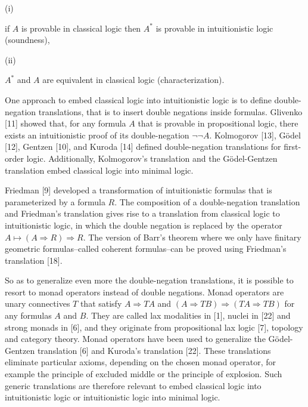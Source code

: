 \par\noindent  (i) 
 
if $A$ is provable in classical logic then $A^{*}$ is provable in intuitionistic logic (soundness),\par
 
 
 
\par\noindent  (ii) 
 
$A^{*}$ and $A$ are equivalent in classical logic (characterization).\par
 
 
  
One approach to embed classical logic into intuitionistic logic is to define double-negation translations, that is to insert double negations inside formulas. Glivenko [11] showed that, for any formula $A$ that is provable in propositional logic, there exists an intuitionistic proof of its double-negation $\neg\neg A$. Kolmogorov [13], Gödel [12], Gentzen [10], and Kuroda [14] defined double-negation translations for first-order logic. Additionally, Kolmogorov’s translation and the Gödel-Gentzen translation embed classical logic into minimal logic.\par
 
 
 
Friedman [9] developed a transformation of intuitionistic formulas that is parameterized by a formula $R$. The composition of a double-negation translation and Friedman’s translation gives rise to a translation from classical logic to intuitionistic logic, in which the double negation is replaced by the operator $A\mapsto(A\mathbin{\Rightarrow}R)\mathbin{\Rightarrow}R$. The version of Barr’s theorem where we only have finitary geometric formulas–called coherent formulas–can be proved using Friedman’s translation [18].\par
 
 
 
So as to generalize even more the double-negation translations, it is possible to resort to monad operators instead of double negations. Monad operators are unary connectives $T$ that satisfy $A\mathbin{\Rightarrow}TA$ and $(A\mathbin{\Rightarrow}TB)\mathbin{\Rightarrow}(TA\mathbin{\Rightarrow}TB)$ for any formulas $A$ and $B$. They are called lax modalities in [1], nuclei in [22] and strong monads in [6], and they originate from propositional lax logic [7], topology and category theory. Monad operators have been used to generalize the Gödel-Gentzen translation [6] and Kuroda’s translation [22]. These translations eliminate particular axioms, depending on the chosen monad operator, for example the principle of excluded middle or the principle of explosion. Such generic translations are therefore relevant to embed classical logic into intuitionistic logic or intuitionistic logic into minimal logic.\par
 
